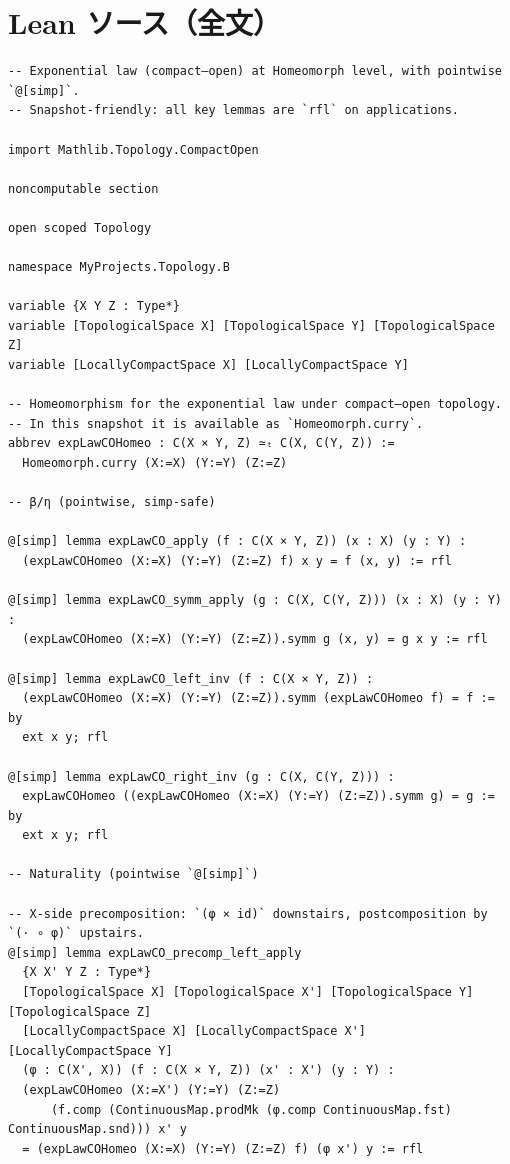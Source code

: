 \documentclass[12pt]{article}
\theoremstyle{definition}
\begin{document}
\section*{Lean ソース（全文）}
\begin{lstlisting}
-- Exponential law (compact–open) at Homeomorph level, with pointwise `@[simp]`.
-- Snapshot-friendly: all key lemmas are `rfl` on applications.

import Mathlib.Topology.CompactOpen

noncomputable section

open scoped Topology

namespace MyProjects.Topology.B

variable {X Y Z : Type*}
variable [TopologicalSpace X] [TopologicalSpace Y] [TopologicalSpace Z]
variable [LocallyCompactSpace X] [LocallyCompactSpace Y]

-- Homeomorphism for the exponential law under compact–open topology.
-- In this snapshot it is available as `Homeomorph.curry`.
abbrev expLawCOHomeo : C(X × Y, Z) ≃ₜ C(X, C(Y, Z)) :=
  Homeomorph.curry (X:=X) (Y:=Y) (Z:=Z)

-- β/η (pointwise, simp-safe)

@[simp] lemma expLawCO_apply (f : C(X × Y, Z)) (x : X) (y : Y) :
  (expLawCOHomeo (X:=X) (Y:=Y) (Z:=Z) f) x y = f (x, y) := rfl

@[simp] lemma expLawCO_symm_apply (g : C(X, C(Y, Z))) (x : X) (y : Y) :
  (expLawCOHomeo (X:=X) (Y:=Y) (Z:=Z)).symm g (x, y) = g x y := rfl

@[simp] lemma expLawCO_left_inv (f : C(X × Y, Z)) :
  (expLawCOHomeo (X:=X) (Y:=Y) (Z:=Z)).symm (expLawCOHomeo f) = f := by
  ext x y; rfl

@[simp] lemma expLawCO_right_inv (g : C(X, C(Y, Z))) :
  expLawCOHomeo ((expLawCOHomeo (X:=X) (Y:=Y) (Z:=Z)).symm g) = g := by
  ext x y; rfl

-- Naturality (pointwise `@[simp]`)

-- X-side precomposition: `(φ × id)` downstairs, postcomposition by `(· ∘ φ)` upstairs.
@[simp] lemma expLawCO_precomp_left_apply
  {X X' Y Z : Type*}
  [TopologicalSpace X] [TopologicalSpace X'] [TopologicalSpace Y] [TopologicalSpace Z]
  [LocallyCompactSpace X] [LocallyCompactSpace X'] [LocallyCompactSpace Y]
  (φ : C(X', X)) (f : C(X × Y, Z)) (x' : X') (y : Y) :
  (expLawCOHomeo (X:=X') (Y:=Y) (Z:=Z)
      (f.comp (ContinuousMap.prodMk (φ.comp ContinuousMap.fst) ContinuousMap.snd))) x' y
  = (expLawCOHomeo (X:=X) (Y:=Y) (Z:=Z) f) (φ x') y := rfl


\end{lstlisting}
\end{document}
